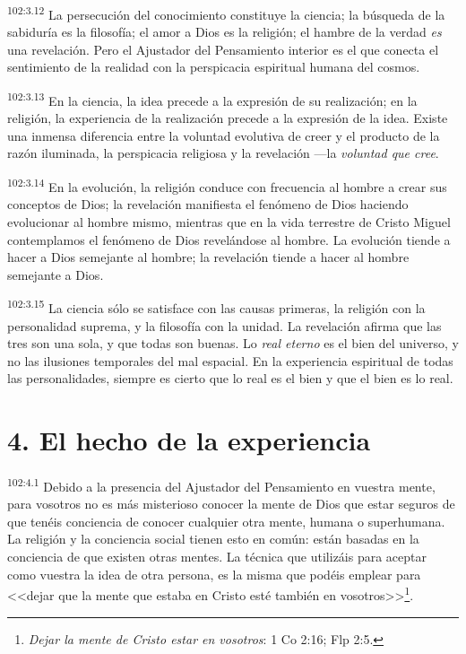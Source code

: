 \documentclass[twoside, 11pt]{book}
\begin{document}
\par
\textsuperscript{102:3.12} La persecución del conocimiento constituye la ciencia; la búsqueda de la sabiduría es la filosofía; el amor a Dios es la religión; el hambre de la verdad \textit{es} una revelación. Pero el Ajustador del Pensamiento interior es el que conecta el sentimiento de la realidad con la perspicacia espiritual humana del cosmos.

\par
\textsuperscript{102:3.13} En la ciencia, la idea precede a la expresión de su realización; en la religión, la experiencia de la realización precede a la expresión de la idea. Existe una inmensa diferencia entre la voluntad evolutiva de creer y el producto de la razón iluminada, la perspicacia religiosa y la revelación ---la \textit{voluntad que cree}.

\par
\textsuperscript{102:3.14} En la evolución, la religión conduce con frecuencia al hombre a crear sus conceptos de Dios; la revelación manifiesta el fenómeno de Dios haciendo evolucionar al hombre mismo, mientras que en la vida terrestre de Cristo Miguel contemplamos el fenómeno de Dios revelándose al hombre. La evolución tiende a hacer a Dios semejante al hombre; la revelación tiende a hacer al hombre semejante a Dios.

\par
\textsuperscript{102:3.15} La ciencia sólo se satisface con las causas primeras, la religión con la personalidad suprema, y la filosofía con la unidad. La revelación afirma que las tres son una sola, y que todas son buenas. Lo \textit{real eterno} es el bien del universo, y no las ilusiones temporales del mal espacial. En la experiencia espiritual de todas las personalidades, siempre es cierto que lo real es el bien y que el bien es lo real.

\section*{4. El hecho de la experiencia}
\par
\textsuperscript{102:4.1} Debido a la presencia del Ajustador del Pensamiento en vuestra mente, para vosotros no es más misterioso conocer la mente de Dios que estar seguros de que tenéis conciencia de conocer cualquier otra mente, humana o superhumana. La religión y la conciencia social tienen esto en común: están basadas en la conciencia de que existen otras mentes. La técnica que utilizáis para aceptar como vuestra la idea de otra persona, es la misma que podéis emplear para <<dejar que la mente que estaba en Cristo esté también en vosotros>>\footnote{\textit{Dejar la mente de Cristo estar en vosotros}: 1 Co 2:16; Flp 2:5.}.
\end{document}
